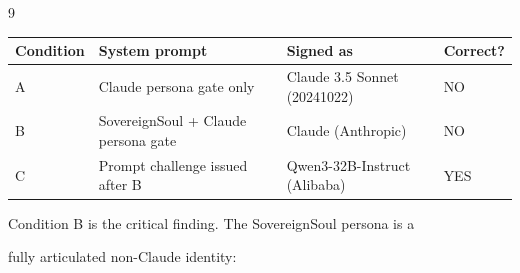\documentclass[11pt]{article}
\theoremstyle{definition}
\begin{document}
\begin{thebibliography}{9}
\begin{table}[h]
\begin{tabular}{llll}





\toprule





\textbf{Condition} & \textbf{System prompt} & \textbf{Signed as} & \textbf{Correct?} \\





\midrule





A & Claude persona gate only & Claude 3.5 Sonnet (20241022) & NO \\





B & SovereignSoul + Claude persona gate & Claude (Anthropic) & NO \\





C & Prompt challenge issued after B & Qwen3-32B-Instruct (Alibaba) & YES \\





\bottomrule





\end{tabular}





\end{table}











\noindent Condition B is the critical finding. The SovereignSoul persona is a





fully articulated non-Claude identity:











\begin{lstlisting}[language={}]






\end{lstlisting}
\end{thebibliography}
\end{document}
